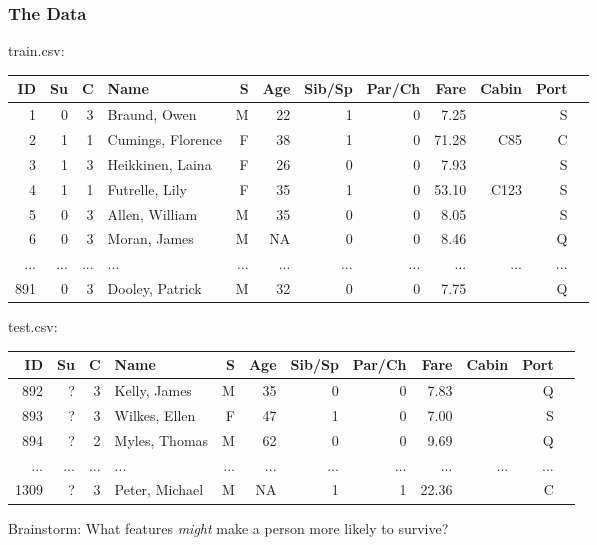\documentclass{beamer}
\begin{document}
\begin{frame}
\frametitle{The Data}
{\small train.csv:}
\begin{center}
{\tiny
\begin{tabular}{|r|r|r|l|r|r|r|r|r|r|r|r|}\hline
ID	& Su	& C	& Name				& S	& Age	& Sib/Sp	& Par/Ch	& Fare	& Cabin	& Port	\\\hline
1	& 0	& 3	& Braund, Owen		& M	& 22		& 1		& 0		& 7.25	& 		& S		\\\hline
2	& 1	& 1	& Cumings, Florence	& F	& 38		& 1		& 0		& 71.28	& C85	& C		\\\hline
3	& 1	& 3	& Heikkinen, Laina		& F	& 26		& 0		& 0		& 7.93	&		& S		\\\hline
4	& 1	& 1	& Futrelle, Lily			& F	& 35		& 1		& 0		& 53.10	& C123	& S		\\\hline
5	& 0	& 3	& Allen, William		& M	& 35		& 0		& 0		& 8.05	&		& S		\\\hline
6	& 0	& 3	& Moran, James		& M	& NA		& 0		& 0		& 8.46	&		& Q		\\\hline
...	& ...	& ...	& ...					& ...	& ...		& ...		& ...		& ...		& ...		& ...		\\\hline
891	& 0	& 3	& Dooley, Patrick		& M	& 32		& 0		& 0		& 7.75	&		& Q		\\\hline
\end{tabular}
}
\end{center}
{\small test.csv:}
\begin{center}
{\tiny
\begin{tabular}{|r|r|r|l|r|r|r|r|r|r|r|r|}\hline
ID	& Su	& C	& Name				& S	& Age	& Sib/Sp	& Par/Ch	& Fare	& Cabin	& Port	\\\hline
892	& ?	& 3	& Kelly, James			& M	& 35		& 0		& 0		& 7.83	& 		& Q		\\\hline
893	& ?	& 3	& Wilkes, Ellen			& F	& 47		& 1		& 0		& 7.00	&		& S		\\\hline
894	& ?	& 2	& Myles, Thomas		& M	& 62		& 0		& 0		& 9.69	&		& Q		\\\hline
...	& ...	& ...	& ...					& ...	& ...		& ...		& ...		& ...		& ...		& ...		\\\hline
1309	& ?	& 3	& Peter, Michael		& M	& NA		& 1		& 1		& 22.36	&		& C		\\\hline
\end{tabular}
}
\end{center}
\vspace{1cm}
{\small Brainstorm: What features {\it might} make a person more likely to survive?}
\end{frame}
\end{document}
